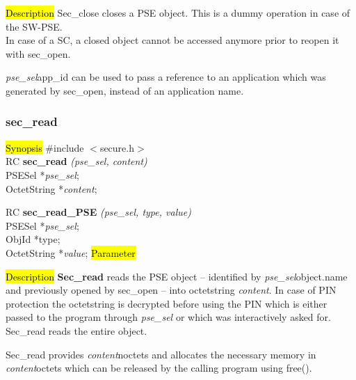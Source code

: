 \hl{Description}
Sec\_close closes a PSE object. This is a dummy operation in case of the SW-PSE. \\ [0.5cm]
In case of a SC, a closed object cannot be accessed anymore prior to reopen 
it with sec\_open. 

{\em pse\_sel}\pf app\_id can be used to pass a reference to an application which was generated
by sec\_open, instead of an application name.

\subsubsection{sec\_read}
\label{sec_read}
\hl{Synopsis}
\#include $<$secure.h$>$ \\ [0.5cm]
RC {\bf sec\_read} {\em (pse\_sel, content)} \\
PSESel *{\em pse\_sel}; \\
OctetString *{\em content}; 

RC {\bf sec\_read\_PSE} {\em (pse\_sel, type, value)} \\
PSESel *{\em pse\_sel}; \\
ObjId *type; \\
OctetString *{\em value};
\hl{Parameter}




\hl{Description}
{\bf Sec\_read} reads the PSE object -- identified by {\em pse\_sel}\pf object.name 
and previously opened by sec\_open -- into octetstring {\em content}.
In case of PIN protection the octetstring is
decrypted before using the PIN which is either passed to the program through {\em pse\_sel}
or which was interactively asked for. Sec\_read reads the entire object. 

Sec\_read provides {\em content}\pf noctets and allocates the necessary memory
in {\em content}\pf octets which can be released by the calling program using free(). 

